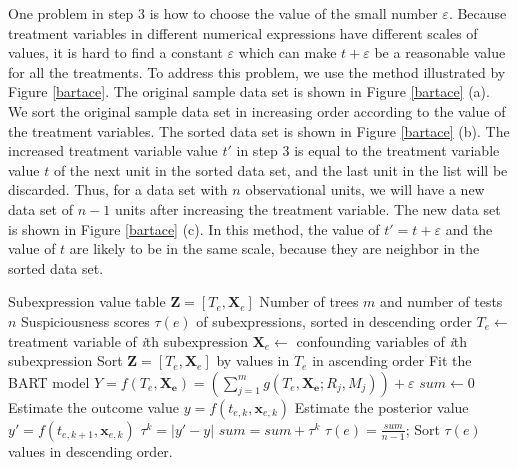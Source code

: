 One problem in step 3 is how to choose the value of the small number $\varepsilon $. Because treatment variables in different numerical expressions have different scales of values, it is hard to find a constant $\varepsilon$ which can make $t+\varepsilon$ be a reasonable value for all the treatments. To address this problem, we use the method illustrated by Figure \ref{bartace}.  The original sample data set is shown in Figure \ref{bartace} (a).  We sort the original sample data set in increasing order according to the value of the treatment variables. The sorted data set is shown in Figure \ref{bartace} (b). The increased treatment variable value $t'$ in step 3 is equal to the treatment variable value $t$ of the next unit in the sorted data set, and the last unit in the list will be discarded. Thus,  for a data set with $n$ observational units, we will have a new data set of $n-1$ units after increasing the treatment variable. The new data set is shown in Figure \ref{bartace} (c). In this method, the value of $t'=t+\varepsilon$ and the value of $t$ are likely to be in the same scale, because they are neighbor in the sorted data set. 

\renewcommand{\algorithmicrequire}{\textbf{Input:}}
\renewcommand{\algorithmicensure}{\textbf{Output:}}
\begin{algorithm}
  \label{BARTalg}
  \begin{algorithmic}[1]
    \Require Subexpression value table $\pmb {Z}=[T_e, \pmb{X}_e]$ 
    \Statex   Number of trees $m$ and number of tests $n$
    \Ensure Suspiciousness scores $\tau \left( e \right)$ of subexpressions, sorted in descending order
        \State        $T_e \gets$ treatment variable of {\it i}th subexpression
        \State        $\pmb{X}_e\gets$ confounding variables of {\it i}th subexpression
        \State        Sort  $\pmb{Z}=[T_e, \pmb{X}_e]$ by values in $T_e$ in ascending order
        \State        Fit the BART model $Y =f(T_e,\pmb{X_e})= \left( {\sum\limits_{j = 1}^m {g(T_e,\pmb{X_e};{R_j},{M_j})} } \right) + \varepsilon$
	 \State	    $sum\gets 0$
            \State Estimate the outcome value $y=f(t_{e,k},{\pmb{x}_{e,k}})$
            \State Estimate the posterior value $y'=f(t_{e,k+1},{\pmb{x}_{e,k}})$
            \State ${\tau ^k} = |y' - y|$
            \State $sum=sum+{\tau ^k} $
        \EndFor
        \State $\tau(e) = \frac{{sum}}{{n - 1}}$;
    \EndFor
    \State Sort  $\tau(e)$ values in descending order.
  \end{algorithmic}
\end{algorithm}

